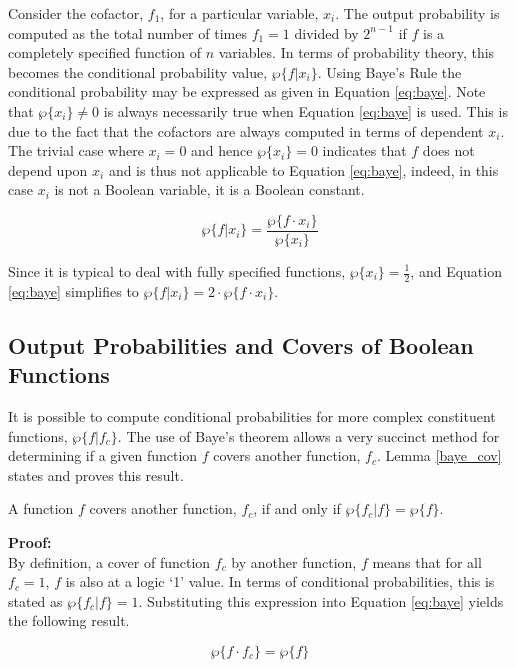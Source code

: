 Consider the cofactor, $f_1$, for a particular variable, $x_i$.  The output probability
is computed as the total number of times $f_1 = 1$ divided by $2^{n-1}$ if $f$ is a 
completely specified function of $n$ variables.  In terms of probability theory,
this becomes the conditional probability value, $\wp \{f | x_i \}$.  Using Baye's Rule
the conditional probability may be expressed as given in Equation \ref{eq:baye}.
Note that $\wp \{ x_i \} \neq 0$ is always necessarily true when Equation \ref{eq:baye} is
used.  This is due to the fact that the cofactors are always computed in terms of dependent
$x_i$.  The trivial case where $x_i=0$ and hence $\wp \{ x_i \} = 0$ indicates that $f$ does not
depend upon $x_i$ and is thus not applicable to Equation \ref{eq:baye}, indeed, in this case
$x_i$ is not a Boolean variable, it is a Boolean constant.

\begin{equation}
\wp \{ f | x_i \} = \frac{\wp \{f \cdot x_i \} }{\wp \{x_i \} }   \label{eq:baye}
\end{equation}

Since it is typical to deal with fully specified functions, $\wp \{ x_i \} = \frac{1}{2}$,
and Equation \ref{eq:baye} simplifies to $\wp \{ f | x_i \} = 2 \cdot \wp \{f \cdot x_i \}$.

\subsection{Output Probabilities and Covers of Boolean Functions}
It is possible to compute conditional probabilities for more complex constituent
functions, $\wp \{ f | f_c \}$.  The use of Baye's theorem allows a very succinct
method for determining if a given function $f$ covers another function, $f_c$.
Lemma \ref{baye_cov} states and proves this result.

\begin{lemma}   \label{baye_cov}
A function $f$ covers another function, $f_c$, if and only if
$\wp \{f_c | f \} = \wp \{ f \}$.
\end{lemma}

\noindent
{\bf Proof:} \\
By definition, a cover of function $f_c$ by another function, $f$
means that for all $f_c=1$, $f$ is also at a logic `1' value.
In terms of conditional probabilities, this is stated as
$\wp \{ f_c | f \} = 1$.  Substituting this expression into 
Equation \ref{eq:baye} yields the following result.

\begin{equation}
\wp \{ f \cdot f_c \} = \wp \{ f \}    \label{eq:cover_result}
\end{equation}

